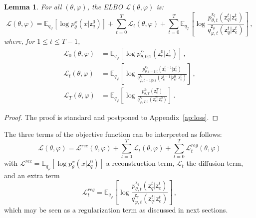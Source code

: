 \documentclass{article}
\theoremstyle{plain}
\newtheorem{lemma}[theorem]{Lemma}
\theoremstyle{definition}
\theoremstyle{remark}
\newcommand{\latentcont}{\mathsf{z}_e}
\newcommand{\latentdis}{\mathsf{z}_q}
\begin{document}
\begin{lemma}
\label{lem:loss}
For all $(\theta,\varphi)$, the ELBO $\mathcal{L}(\theta,\varphi)$ is:
$$
\mathcal{L}(\theta,\varphi) = \mathbb{E}_{q_{\varphi}}\left[\log p^x_{\theta}(x|\latentdis^{0})\right] + \sum_{t=0}^T \mathcal{L}_t(\theta,\varphi)+ \sum_{t=0}^T\mathbb{E}_{q_{\varphi}}\left[\log \frac{p_{\theta,t}^{\latentdis}(\latentdis^{t}|\latentcont^{t})}{q_{\varphi,t}^{\latentdis}(\latentdis^{t}|\latentcont^{t})}\right]\,, 
$$
where, for $1\leqslant t \leqslant T-1$,
\begin{align*}
\mathcal{L}_0(\theta,\varphi) &=  \mathbb{E}_{q_\varphi}\left[\log p^{\latentcont}_{\theta, 0|1}(\latentcont^0|\latentcont^{1})\right]\,,\\
\mathcal{L}_t(\theta,\varphi) &= \mathbb{E}_{q_{\varphi}}\left[\log \frac{p_{\theta,t-1|t}^{\latentcont}(\latentcont^{t-1}|\latentcont^{t})}{q^{\latentcont}_{\varphi,t-1|0,t}(\latentcont^{t-1}|\latentcont^{0},\latentcont^{t})}\right]\,,\\
    \mathcal{L}_T(\theta,\varphi) &= \mathbb{E}_{q_{\varphi}}\left[\log \frac{p^{\latentcont}_{\theta,T}(\latentcont^{T})}{q_{\varphi,T|0}^{\latentcont}(\latentcont^{T}|\latentcont^{0})}\right]\,.
\end{align*}
\end{lemma}
\begin{proof}
The proof is standard and postponed to Appendix~\ref{ap:loss}.
\end{proof}
The three terms of the objective function can be interpreted as follows:
$$
\mathcal{L}(\theta,\varphi) = \mathcal{L}^{rec}(\theta,\varphi) + \sum_{t=0}^T \mathcal{L}_t(\theta,\varphi) + \sum_{t=0}^T \mathcal{L}^{reg}_t(\theta,\varphi)
$$
with $\mathcal{L}^{rec} = \mathbb{E}_{q_{\varphi}}[\log p^x_{\theta}(x|\latentdis^{0})]$ a reconstruction term, $\mathcal{L}_t$ the diffusion term, and an extra term \begin{equation}
\mathcal{L}^{reg}_t = \mathbb{E}_{q_{\varphi}}\left[\log \frac{p_{\theta,t}^{\latentdis}(\latentdis^{t}|\latentcont^{t})}{q_{\varphi,t}^{\latentdis}(\latentdis^{t}|\latentcont^{t})}\right]\,,
\end{equation}
which may be seen as a regularization term as discussed in next sections.
\end{document}
